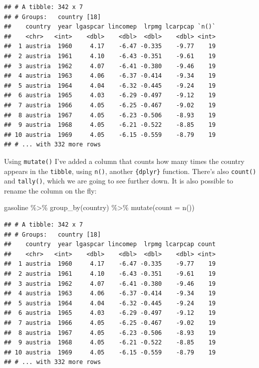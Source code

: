 \documentclass[
]{article}
\newenvironment{Shaded}{\begin{snugshade}}{\end{snugshade}}
\newcommand{\AttributeTok}[1]{\textcolor[rgb]{0.77,0.63,0.00}{#1}}
\newcommand{\FunctionTok}[1]{\textcolor[rgb]{0.00,0.00,0.00}{#1}}
\newcommand{\NormalTok}[1]{#1}
\newcommand{\SpecialCharTok}[1]{\textcolor[rgb]{0.00,0.00,0.00}{#1}}
\begin{document}
\begin{verbatim}
## # A tibble: 342 x 7
## # Groups:   country [18]
##    country  year lgaspcar lincomep  lrpmg lcarpcap `n()`
##    <chr>   <int>    <dbl>    <dbl>  <dbl>    <dbl> <int>
##  1 austria  1960     4.17    -6.47 -0.335    -9.77    19
##  2 austria  1961     4.10    -6.43 -0.351    -9.61    19
##  3 austria  1962     4.07    -6.41 -0.380    -9.46    19
##  4 austria  1963     4.06    -6.37 -0.414    -9.34    19
##  5 austria  1964     4.04    -6.32 -0.445    -9.24    19
##  6 austria  1965     4.03    -6.29 -0.497    -9.12    19
##  7 austria  1966     4.05    -6.25 -0.467    -9.02    19
##  8 austria  1967     4.05    -6.23 -0.506    -8.93    19
##  9 austria  1968     4.05    -6.21 -0.522    -8.85    19
## 10 austria  1969     4.05    -6.15 -0.559    -8.79    19
## # ... with 332 more rows
\end{verbatim}

Using \texttt{mutate()} I've added a column that counts how many times the country appears in the \texttt{tibble},
using \texttt{n()}, another \texttt{\{dplyr\}} function. There's also \texttt{count()} and \texttt{tally()}, which we are going to
see further down. It is also possible to rename the column on the fly:

\begin{Shaded}
\begin{Highlighting}[]
\NormalTok{gasoline }\SpecialCharTok{\%\textgreater{}\%}
  \FunctionTok{group\_by}\NormalTok{(country) }\SpecialCharTok{\%\textgreater{}\%}
  \FunctionTok{mutate}\NormalTok{(}\AttributeTok{count =} \FunctionTok{n}\NormalTok{())}
\end{Highlighting}
\end{Shaded}

\begin{verbatim}
## # A tibble: 342 x 7
## # Groups:   country [18]
##    country  year lgaspcar lincomep  lrpmg lcarpcap count
##    <chr>   <int>    <dbl>    <dbl>  <dbl>    <dbl> <int>
##  1 austria  1960     4.17    -6.47 -0.335    -9.77    19
##  2 austria  1961     4.10    -6.43 -0.351    -9.61    19
##  3 austria  1962     4.07    -6.41 -0.380    -9.46    19
##  4 austria  1963     4.06    -6.37 -0.414    -9.34    19
##  5 austria  1964     4.04    -6.32 -0.445    -9.24    19
##  6 austria  1965     4.03    -6.29 -0.497    -9.12    19
##  7 austria  1966     4.05    -6.25 -0.467    -9.02    19
##  8 austria  1967     4.05    -6.23 -0.506    -8.93    19
##  9 austria  1968     4.05    -6.21 -0.522    -8.85    19
## 10 austria  1969     4.05    -6.15 -0.559    -8.79    19
## # ... with 332 more rows
\end{verbatim}
\end{document}
